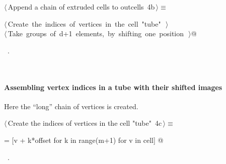 \documentclass[11pt,oneside]{article}	%
\begin{document}
\begin{flushleft} \small
\begin{minipage}{\linewidth} \label{scrap2}
\protect{}$\langle\,$Append a chain of extruded cells to outcells\nobreak\ {\footnotesize 4b}$\,\rangle\equiv$
\vspace{-1ex}
\begin{list}{}{} \item
\mbox{}\verb@@\hbox{$\langle\,$Create the indices of vertices in the cell "tube"\nobreak\ {\footnotesize {}}$\,\rangle$}\verb@@\\
\mbox{}\verb@@\hbox{$\langle\,$Take groups of d+1 elements, by shifting one position\nobreak\ {\footnotesize {}}$\,\rangle$}\verb@   @\\
\mbox{}\verb@@{\NWsep}
\end{list}
\vspace{-1ex}
\footnotesize\addtolength{\baselineskip}{-1ex}
\begin{list}{}{\setlength{\itemsep}{-\parsep}\setlength{\itemindent}{-\leftmargin}}
\item \NWtxtMacroRefIn\ .
\end{list}
\end{minipage}\\[4ex]
\end{flushleft}

\paragraph{Assembling vertex indices in a tube with their shifted images}
Here the ``long'' chain of vertices is created.
\begin{flushleft} \small
\begin{minipage}{\linewidth} \label{scrap3}
\protect{}$\langle\,$Create the indices of vertices in the cell "tube"\nobreak\ {\footnotesize 4c}$\,\rangle\equiv$
\vspace{-1ex}
\begin{list}{}{} \item
\mbox{}\verb@tube = [v + k*offset for k in range(m+1) for v in cell]  @{\NWsep}
\end{list}
\vspace{-1ex}
\footnotesize\addtolength{\baselineskip}{-1ex}
\begin{list}{}{\setlength{\itemsep}{-\parsep}\setlength{\itemindent}{-\leftmargin}}
\item \NWtxtMacroRefIn\ .
\end{list}
\end{minipage}\\[4ex]
\end{flushleft}
\end{document}
